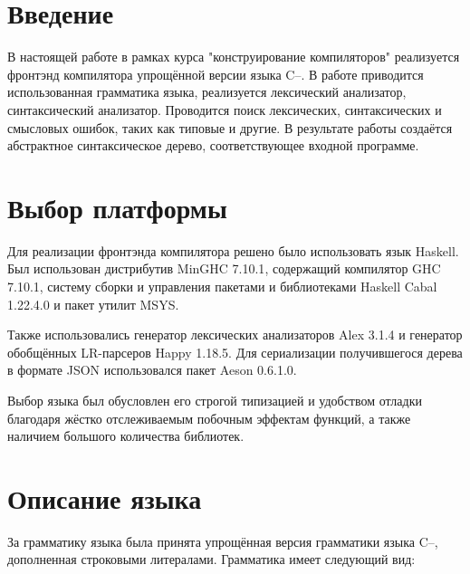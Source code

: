 \documentclass[a4paper,12pt]{report}
\numberwithin{equation}{section}
\begin{document}
 

\setcounter{page}{2}

\tableofcontents

\section{Введение}
В настоящей работе в рамках курса "конструирование компиляторов" реализуется фронтэнд компилятора упрощённой версии языка C--.
В работе приводится использованная грамматика языка, реализуется лексический анализатор, синтаксический анализатор.
Проводится поиск лексических, синтаксических и смысловых ошибок, таких как типовые и другие.
В результате работы создаётся абстрактное синтаксическое дерево, соответствующее входной программе.

\section{Выбор платформы}
Для реализации фронтэнда компилятора решено было использовать язык Haskell.
Был использован дистрибутив MinGHC 7.10.1\cite{minghc}, содержащий компилятор GHC 7.10.1\cite{ghc}, систему сборки и управления пакетами и библиотеками Haskell Cabal 1.22.4.0\cite{cabal} и пакет утилит MSYS\cite{msys}.

Также использовались генератор лексических анализаторов Alex 3.1.4\cite{alex} и генератор обобщённых LR-парсеров Happy 1.18.5\cite{happy}. 
Для сериализации получившегося дерева в формате JSON использовался пакет Aeson 0.6.1.0\cite{aeson}.

Выбор языка был обусловлен его строгой типизацией и удобством отладки благодаря жёстко отслеживаемым побочным эффектам функций, а также наличием большого количества библиотек.

\section{Описание языка}
За грамматику языка была принята упрощённая версия\cite{cmm-grammar} грамматики языка C--, дополненная строковыми литералами.
Грамматика имеет следующий вид:
\end{document}
